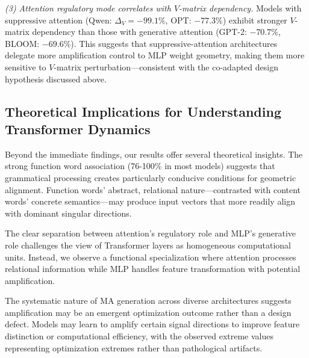 \documentclass[conference]{IEEEtran}
\begin{document}
\textit{(3) Attention regulatory mode correlates with $V$-matrix dependency.}
Models with suppressive attention (Qwen: $\Delta_V = -99.1\%$, OPT: $-77.3\%$) exhibit stronger $V$-matrix dependency than those with generative attention (GPT-2: $-70.7\%$, BLOOM: $-69.6\%$). This suggests that suppressive-attention architectures delegate more amplification control to MLP weight geometry, making them more sensitive to $V$-matrix perturbation---consistent with the co-adapted design hypothesis discussed above.

\subsection{Theoretical Implications for Understanding Transformer Dynamics}

Beyond the immediate findings, our results offer several theoretical insights. The strong function word association (76-100\% in most models) suggests that grammatical processing creates particularly conducive conditions for geometric alignment. Function words' abstract, relational nature—contrasted with content words' concrete semantics—may produce input vectors that more readily align with dominant singular directions.

The clear separation between attention's regulatory role and MLP's generative role challenges the view of Transformer layers as homogeneous computational units. Instead, we observe a functional specialization where attention processes relational information while MLP handles feature transformation with potential amplification.

The systematic nature of MA generation across diverse architectures suggests amplification may be an emergent optimization outcome rather than a design defect. Models may learn to amplify certain signal directions to improve feature distinction or computational efficiency, with the observed extreme values representing optimization extremes rather than pathological artifacts.
\end{document}
